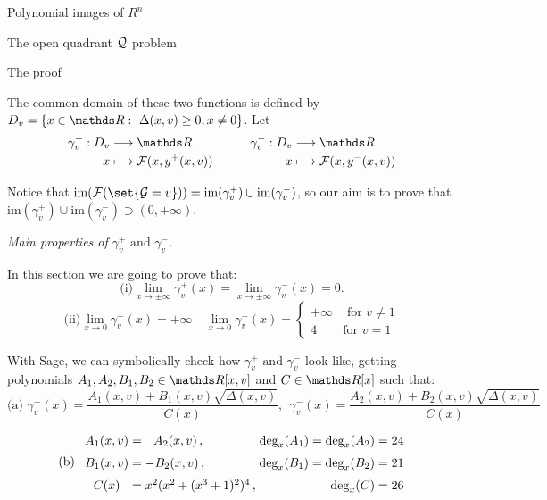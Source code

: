 \documentclass[11pt, a4paper, english, twoside, notitlepage]{report}
\begin{document}
\begin{chapter}{Polynomial images of $R^n$}
\begin{section}{The open quadrant $\mathcal{Q}$ problem}
\begin{subsection}{The proof}
\begin{Proof}
			The common domain of these two functions is defined by $D_v=\{x \in \R :\ \Delta(x,v) \geq 0, x \neq 0\}$. Let
			$$\begin{matrix}
				\begin{aligned}
					\gamma_v^+: D_v & \longrightarrow \R\\
					x &\longmapsto \F(x,y^+(x,v))\\
					\end{aligned}
 				& \qquad
				\begin{aligned}
					\gamma_v^-:D_v & \longrightarrow \R\\
					x &\longmapsto \F(x,y^-(x,v))\\
				\end{aligned}
			\end{matrix}$$
			
			Notice that $\text{im}(\F(\set{\G = v})) = \text{im}(\gamma_v^+) \cup \text{im}(\gamma_v^-)$, so our aim is to prove that $\text{im}(\gamma_v^+) \cup \text{im}(\gamma_v^-) \supset (0, +\infty)$.
			
			\begin{center}
				 \emph{Main properties of $\gamma_v^+ \text{ and } \gamma_v^-$.}
			\end{center}
			
			In this section we are going to prove that:
			$$\text{(i)} \lim_{x\rightarrow \pm\infty}\gamma_v^+(x)=\lim_{x\rightarrow \pm\infty}\gamma_v^-(x)=0.$$
			$$\text{(ii)} \lim_{x\rightarrow 0}\gamma_v^+(x)=+\infty
				\quad 
				\lim_{x\rightarrow 0}\gamma_v^-(x) =
				\left\{\begin{array}{ll}
					+\infty & \text{ for $v\neq 1$}\\
					4 & \text{for $v=1$}
				\end{array} \right.
			$$

			With Sage, we can symbolically check how $\gamma_v^+ \text{ and } \gamma_v^-$ look like, getting polynomials $A_1,A_2,B_1,B_2\in\R[x,v]$ and $C\in \R[x]$ such that:
			$$\text{(a) } \gamma_v^+(x)=\dfrac{A_1(x,v)+B_1(x,v)\sqrt{\Delta(x,v)}}{C(x)}, \ \ 
			\gamma_v^-(x)=\dfrac{A_2(x,v)+B_2(x,v)\sqrt{\Delta(x,v)}}{C(x)}$$
			$$\text{(b)}\ \ 
				\arraycolsep=1.4pt\def\arraystretch{1.5}
				\begin{array}{cclr}
					A_1(x, v) & = &\ \ A_2(x, v)\, , & \text{deg}_x(A_1) = \text{deg}_x(A_2) = 24\\
					B_1(x, v) & = & - B_2(x, v)\, , & \text{deg}_x(B_1) = \text{deg}_x(B_2) = 21\\
					C(x) & = & x^2(x^2+(x^3+1)^2)^4\, , & \text{deg}_x(C) = 26
				\end{array}
			$$
			

\end{Proof}
\end{subsection}
\end{section}
\end{chapter}
\end{document}
